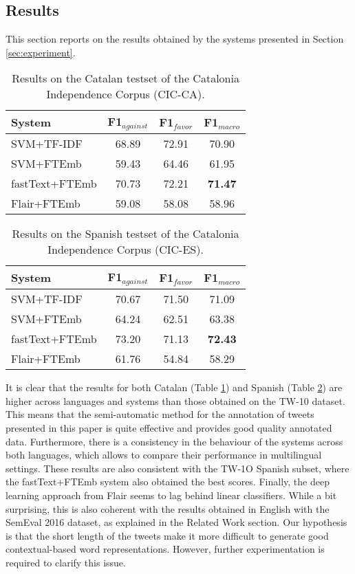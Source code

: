 \documentclass[10pt, a4paper]{article}
\begin{document}
\subsection{Results}\label{sec:results}

This section reports on the results obtained by the systems presented in Section \ref{sec:experiment}.

\begin{table}[!ht]
\begin{tabular}{lccc}\hline
\textbf{System} & F1$_{against}$ & F1$_{favor}$ & F1$_{macro}$ \\ \hline
SVM+TF-IDF & 68.89 & 72.91 & 70.90 \\
SVM+FTEmb & 59.43 & 64.46 & 61.95 \\
fastText+FTEmb & 70.73 & 72.21 & \textbf{71.47} \\
Flair+FTEmb & 59.08 & 58.08 & 58.96 \\ \hline
\end{tabular}
\caption{Results on the Catalan testset of the Catalonia Independence Corpus (CIC-CA).}\label{tab:result_indep_ca}
\end{table}

\begin{table}[!ht]
\centering
\begin{tabular}{lccc}\hline
\textbf{System} & F1$_{against}$ & F1$_{favor}$ & F1$_{macro}$ \\ \hline
SVM+TF-IDF & 70.67 & 71.50 & 71.09 \\
SVM+FTEmb & 64.24 & 62.51 & 63.38 \\
fastText+FTEmb & 73.20 & 71.13 & \textbf{72.43} \\
Flair+FTEmb & 61.76 & 54.84 & 58.29 \\ \hline
\end{tabular}
\caption{Results on the Spanish testset of the Catalonia Independence Corpus (CIC-ES).}\label{tab:result_indep_es}
\end{table}

It is clear that the results for both Catalan (Table \ref{tab:result_indep_ca}) and Spanish (Table \ref{tab:result_indep_es}) are higher across languages and systems than those obtained on the TW-10 dataset. This means that the semi-automatic method for the annotation of tweets presented in this paper is quite effective and provides good quality annotated data. Furthermore, there is a consistency in the behaviour of the systems across both languages, which allows to compare their performance in multilingual settings. These results are also consistent with the TW-1O Spanish subset, where the fastText+FTEmb system also obtained the best scores. Finally, the deep learning approach from Flair seems to lag behind linear classifiers. While a bit surprising, this is also coherent with the results obtained in English with the SemEval 2016 dataset, as explained in the Related Work section. Our hypothesis is that the short length of the tweets make it more difficult to generate good contextual-based word representations. However, further experimentation is required to clarify this issue.
\end{document}
